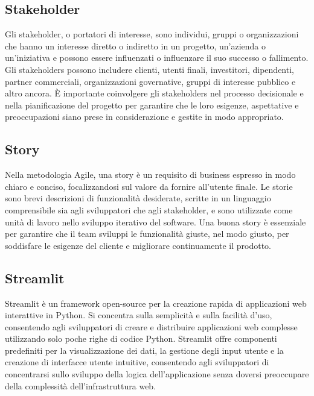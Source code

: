 \vspace{2em}
\subsection*{Stakeholder}
\par Gli stakeholder, o portatori di interesse, sono individui, gruppi o organizzazioni che hanno un interesse diretto o indiretto in un progetto, un'azienda o un'iniziativa e possono essere influenzati o influenzare il suo successo o fallimento. Gli stakeholders possono includere clienti, utenti finali, investitori, dipendenti, partner commerciali, organizzazioni governative, gruppi di interesse pubblico e altro ancora. È importante coinvolgere gli stakeholders nel processo decisionale e nella pianificazione del progetto per garantire che le loro esigenze, aspettative e preoccupazioni siano prese in considerazione e gestite in modo appropriato.

\vspace{2em}
\subsection*{Story}
\par Nella metodologia Agile, una story è un requisito di business espresso in modo chiaro e conciso, focalizzandosi sul valore da fornire all'utente finale. Le storie sono brevi descrizioni di funzionalità desiderate, scritte in un linguaggio comprensibile sia agli sviluppatori che agli stakeholder, e sono utilizzate come unità di lavoro nello sviluppo iterativo del software. Una buona story è essenziale per garantire che il team sviluppi le funzionalità giuste, nel modo giusto, per soddisfare le esigenze del cliente e migliorare continuamente il prodotto.

\vspace{2em}
\subsection*{Streamlit}
\par Streamlit è un framework open-source per la creazione rapida di applicazioni web interattive in Python. Si concentra sulla semplicità e sulla facilità d'uso, consentendo agli sviluppatori di creare e distribuire applicazioni web complesse utilizzando solo poche righe di codice Python. Streamlit offre componenti predefiniti per la visualizzazione dei dati, la gestione degli input utente e la creazione di interfacce utente intuitive, consentendo agli sviluppatori di concentrarsi sullo sviluppo della logica dell'applicazione senza doversi preoccupare della complessità dell'infrastruttura web.


